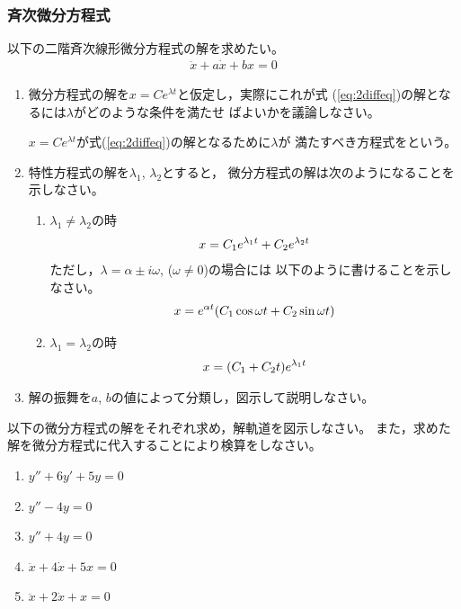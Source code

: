 \documentclass[twocolumn,11pt]{jarticle}
\begin{document}
\subsubsection{斉次微分方程式}
以下の二階斉次線形微分方程式の解を求めたい。
\begin{align}
\label{eq:2diffeq}
\ddot{x}+a\dot{x}+bx=0
\end{align}
\begin{enumerate}
\item 微分方程式の解を$x=Ce^{\lambda t}$と仮定し，実際にこれが式
  (\ref{eq:2diffeq})の解となるには$\lambda$がどのような条件を満たせ
  ばよいかを議論しなさい。

  \comment
  $x=Ce^{\lambda t}$が式(\ref{eq:2diffeq})の解となるために$\lambda$が
  満たすべき方程式をという。
\item 特性方程式の解を$\lambda_1$, $\lambda_2$とすると，
  微分方程式の解は次のようになることを示しなさい。
  \begin{enumerate}
  \item $\lambda_1\ne\lambda_2$の時
    \begin{align}
      x=C_1e^{\lambda_1t}+C_2e^{\lambda_2t}\notag
    \end{align}
    ただし，$\lambda=\alpha\pm i\omega$, ($\omega\ne 0$)の場合には
    以下のように書けることを示しなさい。
    \begin{align}
      x=e^{\alpha t}(C_1\cos{\omega t}+C_2\sin{\omega t})\notag
    \end{align}
  \item $\lambda_1=\lambda_2$の時
    \begin{align}
      x=(C_1+C_2t)e^{\lambda_1t}\notag
    \end{align}
  \end{enumerate}
\item 解の振舞を$a$, $b$の値によって分類し，図示して説明しなさい。
\end{enumerate}

\exercise
以下の微分方程式の解をそれぞれ求め，解軌道を図示しなさい。
また，求めた解を微分方程式に代入することにより検算をしなさい。
\begin{enumerate}
\item $y''+6y'+5y=0$
\item $y''-4y=0$
\item $y''+4y=0$
\item $\ddot{x}+4\dot{x}+5x=0$
\item $\ddot{x}+2\dot{x}+x=0$
\end{enumerate}
\end{document}

